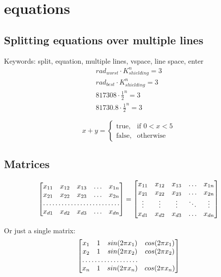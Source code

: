 \section{equations}
\subsection{Splitting equations over multiple lines}
Keywords: split, equation, multiple lines, vspace, line space, enter
\begin{equation}
    \begin{split}
    rad_{worst} \cdot K_{shielding}^n = 3 \\
    rad_{best} \cdot K_{shielding}^n = 3 \\
    817308 \cdot {\frac{1}{2}}^n = 3 \\
    81730.8 \cdot {\frac{1}{2}}^n = 3
    \end{split}
    \label{eq:shield_factor}
\end{equation}

 \[ x+y = \begin{cases} \mbox{true,} & \mbox{if } 0 < x < 5 \\ \mbox{false,} & \mbox{otherwise} \end{cases} \]
\subsection{Matrices}
\[
\begin{bmatrix}
    x_{11}       & x_{12} & x_{13} & \dots & x_{1n} \\
    x_{21}       & x_{22} & x_{23} & \dots & x_{2n} \\
    \hdotsfor{5} \\
    x_{d1}       & x_{d2} & x_{d3} & \dots & x_{dn}
\end{bmatrix}
=
\begin{bmatrix}
    x_{11} & x_{12} & x_{13} & \dots  & x_{1n} \\
    x_{21} & x_{22} & x_{23} & \dots  & x_{2n} \\
    \vdots & \vdots & \vdots & \ddots & \vdots \\
    x_{d1} & x_{d2} & x_{d3} & \dots  & x_{dn}
\end{bmatrix}
\]

Or just a single matrix:
\begin{equation}
\begin{bmatrix}
    x_{1}       & 1 & sin(2\pi x_1) & cos(2\pi x_1)\\
    x_{2}       & 1 & sin(2\pi x_2) & cos(2\pi x_2)\\
    \hdotsfor{3} \\
    x_{n}       & 1 & sin(2\pi x_n) & cos(2\pi x_n)\\
\end{bmatrix}
    \label{eq:h_matrix_q1b}
\end{equation}
